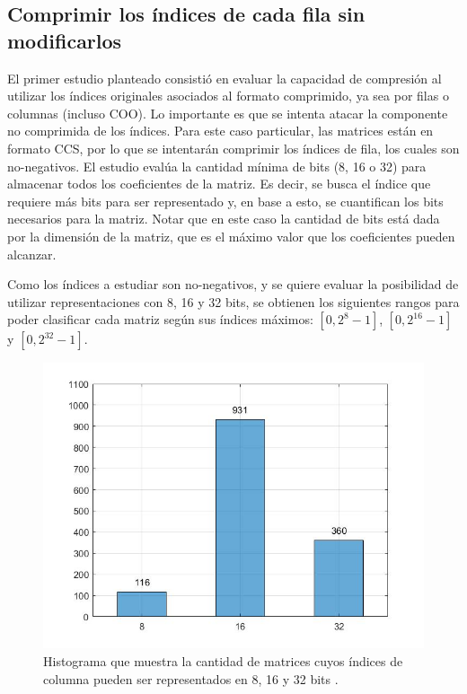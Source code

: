 \subsection{Comprimir los índices de cada fila sin modificarlos}\label{col-index-compression}

El primer estudio planteado consistió en evaluar la capacidad de compresión al utilizar los índices originales asociados %
al formato comprimido, ya sea por filas o columnas (incluso COO). Lo importante es que se intenta atacar la componente no comprimida de los índices. Para este caso particular, las matrices están en formato CCS, por lo que se intentarán comprimir los índices de fila, los cuales son no-negativos. El estudio evalúa la cantidad mínima de bits (8, 16 o 32) para almacenar todos los coeficientes de la matriz. Es decir, se busca el índice que requiere más bits para ser representado y, en base a esto, se cuantifican los bits necesarios para la matriz. Notar que en este caso la cantidad de bits está dada por la dimensión de la matriz, que es el máximo valor que los coeficientes pueden alcanzar. 

Como los índices a estudiar son no-negativos, y se quiere evaluar la posibilidad de utilizar representaciones con 8, 16 y 32 bits, se obtienen los siguientes rangos para poder clasificar cada matriz según sus índices máximos: $[0,2^8 - 1]$, $[0,2^{16} - 1]$ y $[0,2^{32} - 1]$.

\begin{figure}[h]
    \centering
    \includegraphics[width=.6\textwidth]{imagenes/chap4/hist_dim_cat.jpg}
    \caption{Histograma que muestra la cantidad de matrices cuyos índices de columna pueden ser representados en 8, 16 y 32 bits%
    .}
    \label{fig:hist_dim_cat}
\end{figure}

